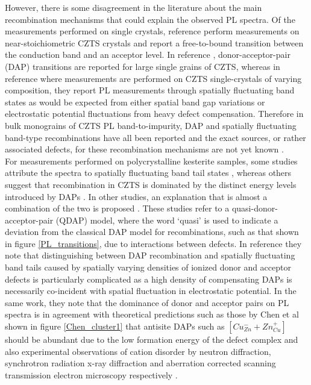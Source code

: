 However, there is some disagreement in the literature about the main recombination mechanisms that could explain the observed PL spectra. Of the measurements performed on single crystals, reference  perform measurements on near-stoichiometric CZTS crystals and report a free-to-bound transition between the conduction band and an acceptor level. In reference , donor-acceptor-pair (DAP) transitions are reported for large single grains of CZTS, whereas in reference  where measurements are performed on CZTS single-crystals of varying composition, they report PL measurements through spatially fluctuating band states as would be expected from either spatial band gap variations or electrostatic potential fluctuations from heavy defect compensation. Therefore in bulk monograins of CZTS PL band-to-impurity, DAP and spatially fluctuating band-type recombinations have all been reported and the exact sources, or rather associated defects, for these recombination mechanisms are not yet known \cite{Gershon_ref18}.\\

For measurements performed on polycrystalline kesterite samples, some studies attribute the spectra to spatially fluctuating band tail states \cite{Romero}, whereas others suggest that recombination in CZTS is dominated by the distinct energy levels introduced by DAPs \cite{Unold, Miyamoto}. In other studies, an explanation that is almost a combination of the two is proposed \cite{Gershon, Gershon_ref18}. These studies refer to a quasi-donor-acceptor-pair (QDAP) model, where the word `quasi' is used to indicate a deviation from the classical DAP model for recombinations, such as that shown in figure \ref{PL_transitions}, due to interactions between defects. In reference  they note that distinguishing between DAP recombination and spatially fluctuating band tails caused by spatially varying densities of ionized donor and acceptor defects is particularly complicated as a high density of compensating DAPs is necessarily co-incident with spatial fluctuation in electrostatic potential. In the same work, they note that the dominance of donor and acceptor pairs on PL spectra is in agreement with theoretical predictions such as those by Chen et al shown in figure \ref{Chen_cluster1} \cite{defect1} that antisite DAPs such as $[Cu_{Zn}^{-} + Zn_{Cu}^{+}]$ should be abundant due to the low formation energy of the defect complex and also experimental observations of cation disorder by neutron diffraction, synchrotron radiation x-ray diffraction and aberration corrected scanning transmission electron microscopy respectively \cite{Schorr, CZTS_Xray, CZTS_TEM}.\\

